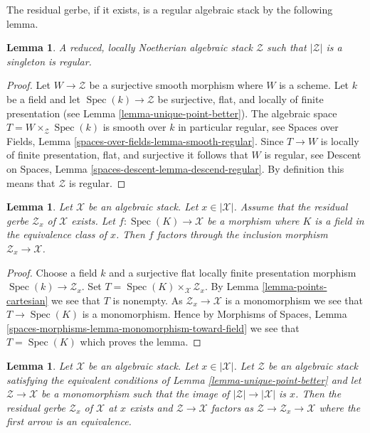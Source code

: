 \documentclass{stacks-project}
\theoremstyle{plain}
\newtheorem{lemma}[subsection]{Lemma}
\theoremstyle{definition}
\theoremstyle{remark}
\numberwithin{equation}{subsection}
\def\Spec{\mathop{\mathrm{Spec}}}
\begin{document}
\noindent
The residual gerbe, if it exists, is a regular algebraic stack
by the following lemma.

\begin{lemma}
\label{lemma-residual-gerbe-regular}
A reduced, locally Noetherian algebraic stack $\mathcal{Z}$ such that
$|\mathcal{Z}|$ is a singleton is regular.
\end{lemma}

\begin{proof}
Let $W \to \mathcal{Z}$ be a surjective smooth morphism where $W$ is a scheme.
Let $k$ be a field and let $\Spec(k) \to \mathcal{Z}$ be surjective,
flat, and locally of finite presentation (see
Lemma \ref{lemma-unique-point-better}).
The algebraic space $T = W \times_\mathcal{Z} \Spec(k)$ is
smooth over $k$ in particular regular, see
Spaces over Fields, Lemma \ref{spaces-over-fields-lemma-smooth-regular}.
Since $T \to W$ is locally of finite presentation, flat, and surjective it
follows that $W$ is regular, see
Descent on Spaces, Lemma \ref{spaces-descent-lemma-descend-regular}.
By definition this means that $\mathcal{Z}$ is regular.
\end{proof}

\begin{lemma}
\label{lemma-residual-gerbe-points}
Let $\mathcal{X}$ be an algebraic stack. Let $x \in |\mathcal{X}|$.
Assume that the residual gerbe $\mathcal{Z}_x$ of $\mathcal{X}$ exists.
Let $f : \Spec(K) \to \mathcal{X}$ be a morphism where $K$ is a field
in the equivalence class of $x$. Then $f$ factors through the inclusion
morphism $\mathcal{Z}_x \to \mathcal{X}$.
\end{lemma}

\begin{proof}
Choose a field $k$ and a surjective flat locally finite presentation
morphism $\Spec(k) \to \mathcal{Z}_x$. Set
$T = \Spec(K) \times_\mathcal{X} \mathcal{Z}_x$. By
Lemma \ref{lemma-points-cartesian}
we see that $T$ is nonempty. As $\mathcal{Z}_x \to \mathcal{X}$
is a monomorphism we see that $T \to \Spec(K)$ is a monomorphism.
Hence by
Morphisms of Spaces, Lemma
\ref{spaces-morphisms-lemma-monomorphism-toward-field}
we see that $T = \Spec(K)$ which proves the lemma.
\end{proof}

\begin{lemma}
\label{lemma-residual-gerbe-unique}
Let $\mathcal{X}$ be an algebraic stack. Let $x \in |\mathcal{X}|$.
Let $\mathcal{Z}$ be an algebraic stack satisfying the equivalent conditions of
Lemma \ref{lemma-unique-point-better}
and let $\mathcal{Z} \to \mathcal{X}$ be a monomorphism such that the image
of $|\mathcal{Z}| \to |\mathcal{X}|$ is $x$. Then the residual gerbe
$\mathcal{Z}_x$ of $\mathcal{X}$ at $x$ exists and
$\mathcal{Z} \to \mathcal{X}$ factors as
$\mathcal{Z} \to \mathcal{Z}_x \to \mathcal{X}$ where the first arrow
is an equivalence.
\end{lemma}
\end{document}
